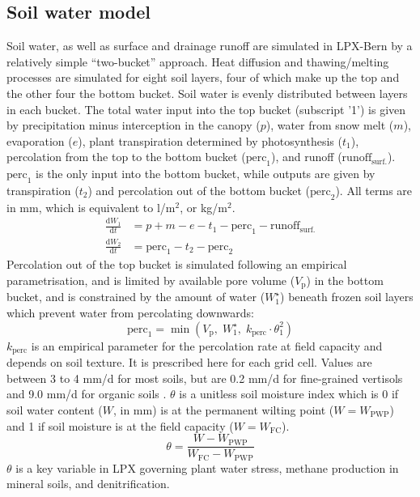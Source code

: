 \subsection{Soil water model}
Soil water, as well as surface and drainage runoff are simulated in LPX-Bern by a relatively simple ``two-bucket'' approach. Heat diffusion and thawing/melting processes are simulated for eight soil layers, four of which make up the top and the other four the bottom bucket. Soil water is evenly distributed between layers in each bucket. The total water input into the top bucket (subscript '1') is given by precipitation minus interception in the canopy ($p$), water from snow melt ($m$), evaporation ($e$), plant transpiration determined by photosynthesis ($t_1$), percolation from the top to the bottom bucket ($\text{perc}_1$), and runoff ($\text{runoff}_{\text{surf.}}$). $\text{perc}_1$ is the only input into the bottom bucket, while outputs are given by transpiration ($t_2$) and percolation out of the bottom bucket ($\text{perc}_2$). All terms are in mm, which is equivalent to l/m$^2$, or kg/m$^2$.
\begin{align}
\label{eq:waterbal}
\frac{\text{d} W_1}{\text{d} t} &= p + m - e - t_1 - \text{perc}_1 - \text{runoff}_{\text{surf.}} \\
\frac{\text{d} W_2}{\text{d} t} &=  \text{perc}_1 - t_2 -  \text{perc}_2
\end{align}
Percolation out of the top bucket is simulated following an empirical parametrisation, and is limited by available pore volume ($V_{\text{p}}$) in the bottom bucket, and is constrained by the amount of water ($W_1^{\star}$) beneath frozen soil layers which prevent water from percolating downwards: 
\begin{equation}
\text{perc}_1 = \min( V_{\text{p}}, \; W_1^{\star}, \; k_{\text{perc}}\cdot \theta_1^{2} )
\end{equation}
$k_{\text{perc}}$ is an empirical parameter for the percolation rate at field capacity and depends on soil texture. It is prescribed here for each grid cell. Values are between 3 to 4 mm/d for most soils, but are 0.2 mm/d for fine-grained vertisols and 9.0 mm/d for organic soils \citet{sitch03gcb}. $\theta$ is a unitless soil moisture index which is 0 if soil water content ($W$, in mm) is at the permanent wilting point ($W=W_{\text{PWP}}$) and 1 if soil moisture is at the field capacity ($W=W_{\text{FC}}$). 
\begin{equation}
  \theta = \frac{ W - W_{\text{PWP}} } { W_{\text{FC}} - W_{\text{PWP}} }
\label{eq:soilmind}
\end{equation}
$\theta$ is a key variable in LPX governing plant water stress, methane production in mineral soils, and denitrification.\\

